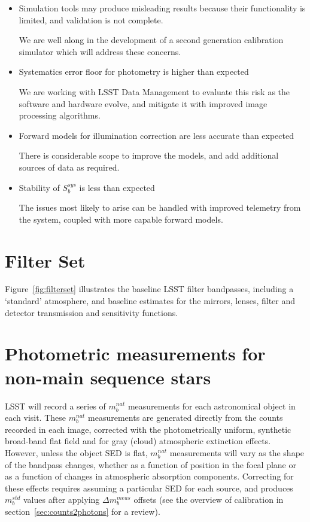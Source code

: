 \documentclass[12pt,preprint]{aastex}
\begin{document}
\begin{itemize}
\item {Simulation tools may produce misleading results because their functionality is limited, and
validation is not complete.}  

We are well along in the development of a second generation calibration
simulator which will address these concerns.

\item {Systematics error floor for photometry is higher than expected}

We are working with LSST Data Management to evaluate this risk as the software and hardware evolve,
and mitigate it with improved image processing algorithms.

\item {Forward models for illumination correction are less accurate than expected}

There is considerable scope to improve the models, and add additional sources of data as required.

\item {Stability of $S_b^{sys}$ is less than expected}

The issues most likely to arise can be handled with improved telemetry from the system, coupled with 
more capable forward models.

\end{itemize}





\appendix

\newpage
\section{Filter Set}

Figure~\ref{fig:filterset} illustrates the baseline LSST filter
bandpasses, including a `standard' atmosphere, and baseline estimates
for the mirrors, lenses, filter and detector transmission and
sensitivity functions. 



\section{Photometric measurements for non-main sequence stars}
\label{sec:photo_better}

LSST will record a series of $m_b^{nat}$ measurements for each
astronomical object in each visit. These $m_b^{nat}$ measurements are
generated directly from the counts recorded in each image, corrected
with the photometrically uniform, synthetic broad-band flat field and for gray
(cloud) atmospheric extinction effects. However, unless the object SED is flat, $m_b^{nat}$
measurements will vary as the shape of the bandpass changes, whether
as a function of position in the focal plane or as a function of
changes in atmospheric absorption components. Correcting for these
effects requires assuming a particular SED for each source, and
produces $m_b^{std}$ values after applying $\Delta m_b^{meas}$ offsets
(see the overview of calibration in section~\ref{sec:counts2photons}
for a review).
\end{document}
